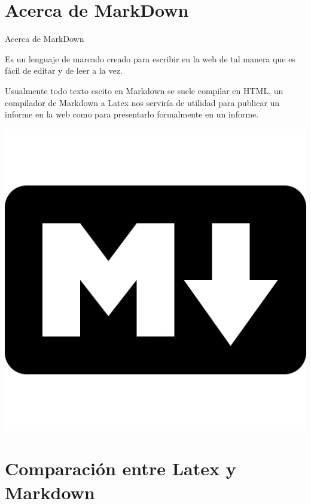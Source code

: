 \documentclass[11pt]{beamer}
\begin{document}
\begin{frame}
\titlepage
\end{frame}

\begin{frame}
\tableofcontents
\end{frame}

\section{Acerca de MarkDown}

\begin{frame}{Acerca de MarkDown}

Es un lenguaje de marcado creado para escribir en la web de tal manera que es fácil de editar y de leer a la vez.

Usualmente todo texto escito en Markdown se suele compilar en HTML, un compilador de Markdown a Latex nos serviría de utilidad para publicar un informe en la web como para presentarlo formalmente en un informe.
\begin{center}
\includegraphics[scale=0.2]{imagenes/markdown-512.png} 
\end{center}
\end{frame}

\section{Comparación entre Latex y Markdown}
\end{document}
